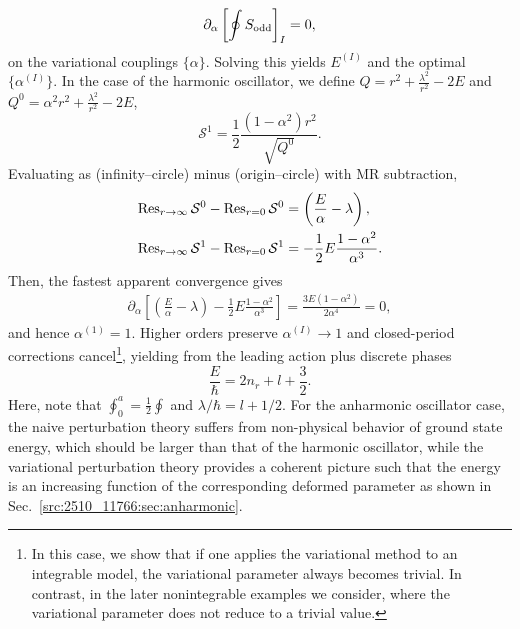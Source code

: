 \begin{align}
\partial_\alpha \left[\oint S_{\mathrm{odd}}\right]_{I}=0 ,
\end{align}
on the variational couplings $\{\alpha\}$.
Solving this yields $E^{(I)}$ and the optimal $\{\alpha^{(I)}\}$.
In the case of the harmonic oscillator, we define $Q=r^2+\frac{\lambda^2}{r^2}-2E$ and
$Q^0=\alpha^2 r^2+\frac{\lambda^2}{r^2}-2E$,
\begin{equation}
\mathcal{S}^1=\frac{1}{2} \frac{(1-\alpha^2) r^2}{\sqrt{Q^0}} .
\end{equation}
Evaluating as (infinity–circle) minus (origin–circle) with MR subtraction,
\begin{align}
    \operatorname{Res}_{r\to\infty}\mathcal{S}^0 - \operatorname{Res}_{r=0}\mathcal{S}^0 &= \left(\frac{E}{\alpha}-\lambda\right), \\
    \operatorname{Res}_{r\to\infty}\mathcal{S}^1 - \operatorname{Res}_{r=0}\mathcal{S}^1 &= - \frac{1}{2} E\frac{1-\alpha^2}{\alpha^3} .
\end{align}
Then, the fastest apparent convergence gives
\begin{align}
    \partial_\alpha\left[\left(\frac{E}{\alpha}-\lambda\right) - \frac{1}{2}E\frac{1-\alpha^2}{\alpha^3}\right]
    = \frac{3 E (1-\alpha^2)}{2\alpha^4}= 0 ,
\end{align}
and hence $\alpha^{(1)}=1$.
Higher orders preserve $\alpha^{(I)}\to1$ and closed-period corrections cancel\footnote{In this case, we show that if one applies the variational method to an integrable model, the variational parameter always becomes trivial. In contrast, in the later nonintegrable examples we consider, where the variational parameter does not reduce to a trivial value.}, yielding from the leading action plus discrete phases
\begin{equation}
\frac{E}{\hbar}=2n_r+l+\frac{3}{2}.
\end{equation}
Here, note that $\oint_0^{a}=\frac{1}{2}\oint$ and $\lambda/\hbar=l+1/2$.
For the anharmonic oscillator case, the naive perturbation theory suffers from non-physical behavior of ground state energy, which should be larger than that of the harmonic oscillator, while the variational perturbation theory provides a coherent picture such that the energy is an increasing function of the corresponding deformed parameter as shown in Sec.~\ref{src:2510_11766:sec:anharmonic}.
